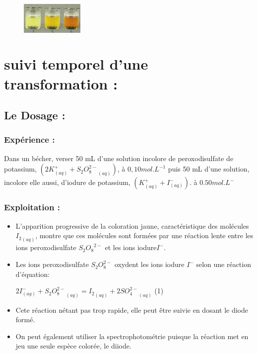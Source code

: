 \documentclass[12pt]{article}
\begin{document}
\begin{figure}
	\vspace{-3cm}
	\includegraphics[width=0.27\textwidth]{./img/STidureavecperoxo.png}
\end{figure}



\section{suivi temporel d'une transformation :  }
\subsection{Le Dosage : }
\subsubsection{Expérience : }
Dans un bécher, verser 50 mL d'une solution incolore de peroxodisulfate de potassium, 
$(2K^+_{(aq)} + {S_2O_8^{2-}}_{(aq)})$, à $0,10 mol.L^{-1}$ puis 50 mL d'une solution, incolore elle aussi, d'iodure de potassium, $(K^+_{(aq)} +I^-_{(aq)})$.
à $0.50 mol.L^-$


\subsubsection{Exploitation :}
\begin{itemize}
	\item L'apparition progressive de la coloration jaune, caractéristique des molécules ${I_2}_{(aq)}$, montre que ces molécules sont formées par une réaction lente entre les ions peroxodisulfate ${S_2O_8}^{2-}$ et les ions iodure$I^-$. 

\item Les ions peroxodisulfate $S_2O_8^{2-}$ oxydent les ions iodure $I^-$ selon une réaction d'équation: 

	$2I^-_{(ag)} + {S_2O_8^{2-}}_{(aq)} = {I_2}_{(aq)} + 2{SO_4^{2-}}_{(aq)}$ (1)

	\item Cete réaction nétant pas trop rapide, elle peut être suivie en dosant le
diode formé.

\item On peut également utiliser la spectrophotométrie puisque la réaction met en jeu une seule espèce colorée, le diiode.
\end{itemize}
\end{document}
